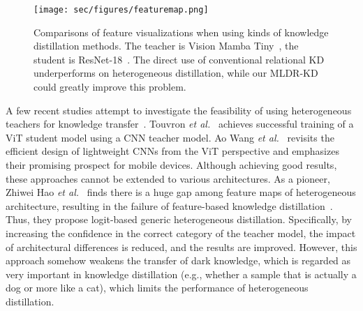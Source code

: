 \begin{figure}[t]
  \centering
  \texttt{[image: sec/figures/featuremap.png]}
  \vspace{-3mm}
  \caption{Comparisons of feature visualizations when using kinds of knowledge distillation methods. The teacher is Vision Mamba Tiny~\cite{vim}, the student is ResNet-18~\cite{he2016deep}. The direct use of conventional relational KD underperforms on heterogeneous distillation, while our MLDR-KD could greatly improve this problem.}
  \label{fig:featuremap}
  \vspace{-5mm}
\end{figure}

A few recent studies attempt to investigate the feasibility of using heterogeneous teachers for knowledge transfer~\cite{yu2024unleashing,Liu2024DDKDD,wang2024the}. Touvron \textit{et al.}~\cite{touvron2022deit} achieves successful training of a ViT student model using a CNN teacher model. Ao Wang \textit{et al.}~\cite{wang2024repvit} revisits the efficient design of lightweight CNNs from the ViT perspective and emphasizes their promising prospect for mobile devices. Although achieving good results, these approaches cannot be extended to various architectures.
As a pioneer, Zhiwei Hao \textit{et al.}~\cite{hao2024one} finds there is a huge gap among feature maps of heterogeneous architecture, resulting in the failure of feature-based knowledge distillation~\cite{peng2019correlation,Heo_2019_ICCV,zagoruyko2022paying,romero2014fitnets,Heo2018KnowledgeTV,Yim2017AGF,Ahn2019VariationalID,Chen2022KnowledgeDW,Chen2021DistillingKV,guo2023class,Li2021OnlineKD,Lin2022KnowledgeDV}. Thus, they propose logit-based generic heterogeneous distillation. 
Specifically, by increasing the confidence in the correct category of the teacher model, the impact of architectural differences is reduced, and the results are improved. However, this approach somehow weakens the transfer of dark knowledge, which is regarded as very important in knowledge distillation (e.g., whether a sample that is actually a dog or more like a cat), which limits the performance of heterogeneous distillation.

